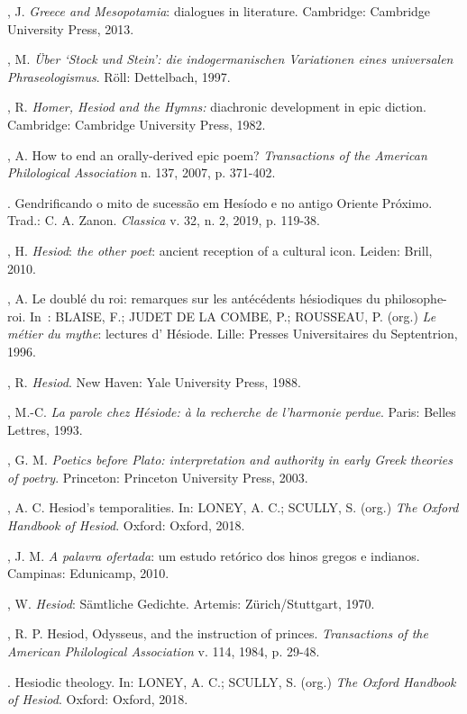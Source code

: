 \begin{bibliohedra}
, J. \emph{Greece and Mesopotamia}: dialogues in literature.
Cambridge: Cambridge University Press, 2013.

, M. \emph{Über `Stock und Stein': die indogermanischen Variationen
eines universalen Phraseologismus}. Röll: Dettelbach, 1997.

, R. \emph{Homer, Hesiod and the Hymns:} diachronic development in
epic diction. Cambridge: Cambridge University Press, 1982.

, A. How to end an orally-derived epic poem? \emph{Transactions of
the American Philological Association} n. 137, 2007, p. 371-402.

\titidem. Gendrificando o mito de sucessão em Hesíodo e no antigo Oriente
Próximo. Trad.: C. A. Zanon. \emph{Classica} v. 32, n. 2, 2019, p.
119-38.

, H. \emph{Hesiod}: \emph{the other poet}: ancient reception of a
cultural icon. Leiden: Brill, 2010.

, A. Le doublé du roi: remarques sur les antécédents hésiodiques du
philosophe-roi. In~: BLAISE, F.; JUDET DE LA COMBE, P.; ROUSSEAU, P.
(org.) \emph{Le métier du mythe}: lectures d' Hésiode. Lille: Presses
Universitaires du Septentrion, 1996.

, R. \emph{Hesiod}. New Haven: Yale University Press, 1988.

, M.-C. \emph{La parole chez Hésiode: à la recherche de
l'harmonie perdue}. Paris: Belles Lettres, 1993.

, G. M. \emph{Poetics before Plato: interpretation and
authority in early Greek theories of poetry}. Princeton: Princeton
University Press, 2003.

, A. C. Hesiod's temporalities. In: LONEY, A. C.; SCULLY, S. (org.)
\emph{The Oxford Handbook of Hesiod}. Oxford: Oxford, 2018.

, J. M. \emph{A palavra ofertada}: um estudo retórico dos hinos
gregos e indianos. Campinas: Edunicamp, 2010.

, W. \emph{Hesiod}: Sämtliche Gedichte. Artemis: Zürich/Stuttgart,
1970.

, R. P. Hesiod, Odysseus, and the instruction of princes.
\emph{Transactions of the American Philological Association} v. 114,
1984, p. 29-48.

\titidem. Hesiodic theology. In: LONEY, A. C.; SCULLY, S. (org.) \emph{The
Oxford Handbook of Hesiod}. Oxford: Oxford, 2018.


\end{bibliohedra}
